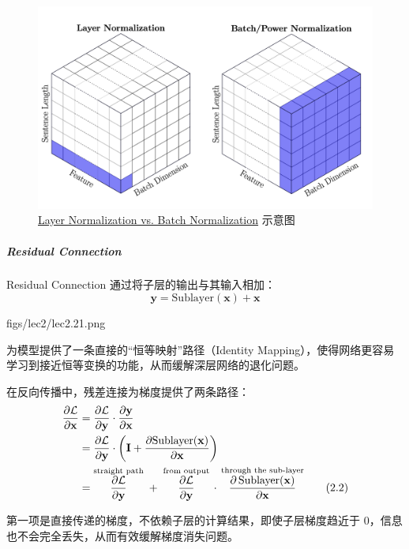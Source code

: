 \begin{figure}[htbp]
  \centering
  \includegraphics[width=0.6\linewidth]{figs/lec2/lec2.20.png}
  \caption{\href{http://proceedings.mlr.press/v119/shen20e/shen20e.pdf}{Layer Normalization vs. Batch Normalization} 示意图}
  \label{fig:layernorm}
\end{figure}

\clearpage
\subparagraph{Residual Connection}  
Residual Connection 通过将子层的输出与其输入相加：
\[
\mathbf{y} = \mathrm{Sublayer}(\mathbf{x}) + \mathbf{x}
\]

\MarginImageWithNote
  {figs/lec2/lec2.21.png}
  {}

为模型提供了一条直接的“恒等映射”路径（Identity Mapping），使得网络更容易学习到接近恒等变换的功能，从而缓解深层网络的退化问题。

在反向传播中，残差连接为梯度提供了两条路径：  
\begin{align}
\frac{\partial \mathcal{L}}{\partial \mathbf{x}}
&= \frac{\partial \mathcal{L}}{\partial \mathbf{y}} \cdot \frac{\partial \mathbf{y}}{\partial \mathbf{x}} \notag\\
&= \frac{\partial \mathcal{L}}{\partial \mathbf{y}} \cdot \left( \mathbf{I} + \frac{\partial \mathrm{Sublayer}(\mathbf{x})}{\partial \mathbf{x}} \right) \notag\\
&= \overset{\text{straight path}}{\frac{\partial \mathcal{L}}{\partial \mathbf{y}}}
\;+\;
\overset{\text{from output}}{\frac{\partial \mathcal{L}}{\partial \mathbf{y}}}
\,\cdot\,
\overset{\text{through the sub-layer}}{\frac{\partial\,\mathrm{Sublayer}(\mathbf{x})}{\partial \mathbf{x}}}
\tag{2.2}
\end{align}

第一项是直接传递的梯度，不依赖子层的计算结果，即使子层梯度趋近于 0，信息也不会完全丢失，从而有效缓解梯度消失问题。

